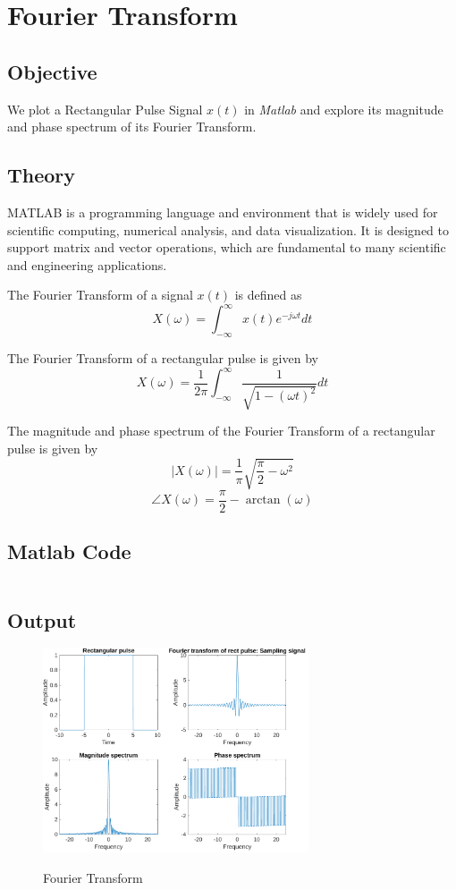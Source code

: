 \section{Fourier Transform}
\label{sec:fourier transform}

\subsection{Objective}
We plot a Rectangular Pulse Signal $x(t)$ in \textit{Matlab} and explore 
its magnitude and phase spectrum of its Fourier Transform.

\subsection{Theory}

MATLAB is a programming language and environment that is widely used for
scientific computing, numerical analysis, and data visualization. It is designed to
support matrix and vector operations, which are fundamental to many scientific and
engineering applications.

The Fourier Transform of a signal $x(t)$ is defined as
\begin{equation}
	X(\omega) = \int_{-\infty}^{\infty} x(t) e^{-j\omega t} dt
\end{equation}

The Fourier Transform of a rectangular pulse is given by
\begin{equation}
	X(\omega) = \frac{1}{2\pi} \int_{-\infty}^{\infty} \frac{1}{\sqrt{1 - (\omega t)^2}} dt
\end{equation}

The magnitude and phase spectrum of the Fourier Transform of a rectangular pulse is given by
\begin{equation}
	|X(\omega)| = \frac{1}{\pi} \sqrt{\frac{\pi}{2} - \omega^2}
\end{equation}
\begin{equation}
	\angle X(\omega) = \frac{\pi}{2} - \arctan(\omega)
\end{equation}


\subsection{Matlab Code}

\inputminted[fontsize=\footnotesize,autogobble]{matlab}{code/fourier.m}

\subsection{Output}

\begin{figure}[!htb]
	\centering
	\includegraphics[width=0.7\textwidth]{res/figures/Figure_1.pdf}
	\label{output:fourier transform}
	\caption{Fourier Transform}
\end{figure}
